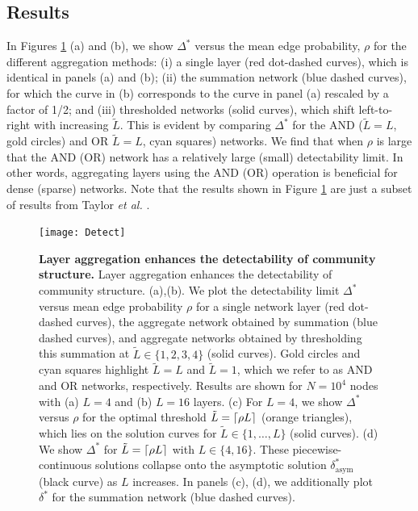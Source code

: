 \subsection{Results}

In Figures \ref{Detect} (a) and (b), we show $\Delta^{*}$ versus the mean edge probability, $\rho$ for the different aggregation methods: (i) a single layer (red dot-dashed curves), which is identical in panels (a) and (b); (ii) the summation network (blue dashed curves), for which the curve in (b) corresponds to the curve in panel (a) rescaled by a factor of 1/2; and (iii) thresholded networks (solid curves), which shift left-to-right with increasing $\tilde{L}$. This is evident by comparing $\Delta^{*}$ for the AND ($\tilde{L}=L$, gold circles) and OR $\tilde{L}=L$, cyan squares) networks. We find that when $\rho$ is large that the AND (OR) network has a relatively large (small) detectability limit. In other words, aggregating layers using the AND (OR) operation is beneficial for dense (sparse) networks. Note that the results shown in Figure \ref{Detect} are just a subset of results from Taylor \emph{et al.} \cite{taylor2015enhanced}. 

\begin{figure}
\begin{center}
\texttt{[image: Detect]}
\caption{{\bf Layer aggregation enhances the detectability of community structure.} Layer aggregation enhances the detectability of community structure. (a),(b). We plot the detectability limit $\Delta^{*}$ versus mean edge probability $\rho$ for a single network layer (red dot-dashed curves), the aggregate network obtained by summation (blue dashed curves), and aggregate networks obtained by thresholding this summation at $\tilde{L} \in \{1,2,3,4\}$ (solid curves). Gold circles and cyan squares highlight $\tilde{L}=L$ and $\tilde{L}=1$, which we refer to as AND and OR networks, respectively. Results are shown for $N=10^{4}$ nodes with (a) $L=4$ and (b) $L=16$ layers. (c) For $L=4$, we show $\Delta^{*}$ versus $\rho$ for the optimal threshold $\tilde{L}=\ceil*{\rho L}$ (orange triangles), which lies on the solution curves for $\tilde{L} \in \{1,\dots,L\}$ (solid curves). (d) We show $\Delta^{*}$ for $\tilde{L}=\ceil*{\rho L}$ with $L \in \{4,16\}$. These piecewise-continuous solutions collapse onto the asymptotic solution $\delta_{\text{asym}}^{*}$ (black curve) as $L$ increases. In panels (c), (d), we additionally plot $\delta^{*}$ for the summation network (blue dashed curves). }
\label{Detect}
\end{center}
\end{figure}

